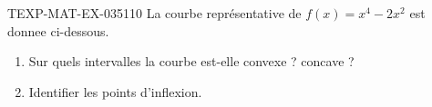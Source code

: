 \begin{exercice}{TEXP-MAT-EX-035}{1}{10}
La courbe représentative de $f(x) = x^4 - 2x^2$ est donnee ci-dessous.
\begin{enumerate}
  \item Sur quels intervalles la courbe est-elle convexe ? concave ?
  \item Identifier les points d'inflexion.
\end{enumerate}

\end{exercice}
